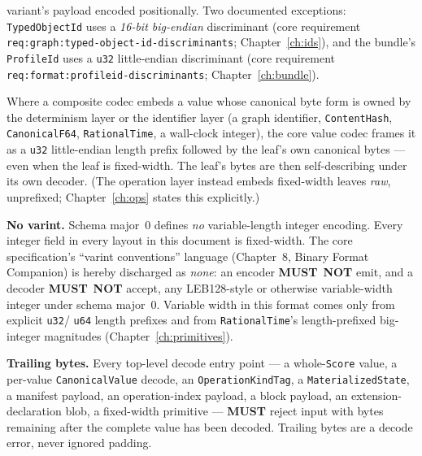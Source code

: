 \documentclass[11pt,letterpaper]{report}
\newcommand{\sectionsc}[1]{{\addfontfeatures{Letters=SmallCaps}#1}}
\newcounter{requirement}[chapter]
\newcommand{\MUST}{\textbf{MUST}}
\newcommand{\MUSTNOT}{\textbf{MUST}\nobreak\ \textbf{NOT}}
\begin{document}
\begin{description}
    variant's payload encoded positionally. Two documented exceptions:
    \texttt{TypedObjectId} uses a \emph{16-bit big-endian} discriminant
    (core requirement \texttt{req:graph:typed-object-id-discriminants};
    Chapter~\ref{ch:ids}), and the bundle's \texttt{ProfileId} uses a
    \texttt{u32} little-endian discriminant (core requirement
    \texttt{req:format:profileid-discriminants}; Chapter~\ref{ch:bundle}).
  \item[Determinism-canonical leaves.] Where a composite codec embeds a value
    whose canonical byte form is owned by the determinism layer or the
    identifier layer (a graph identifier, \texttt{ContentHash},
    \texttt{CanonicalF64}, \texttt{RationalTime}, a wall-clock integer), the
    core value codec frames it as a \texttt{u32} little-endian length prefix
    followed by the leaf's own canonical bytes --- even when the leaf is
    fixed-width. The leaf's bytes are then self-describing under its own
    decoder. (The operation layer instead embeds fixed-width leaves
    \emph{raw}, unprefixed; Chapter~\ref{ch:ops} states this explicitly.)
\end{description}

\begin{requirement}
\label{req:binfmt:no-varint}
\textbf{No varint.} Schema major~0 defines \emph{no} variable-length integer
encoding. Every integer field in every layout in this document is
fixed-width. The core specification's ``varint conventions'' language
(Chapter~8, \sectionsc{Binary Format Companion}) is hereby discharged as
\emph{none}: an encoder \MUSTNOT{} emit, and a decoder \MUSTNOT{} accept, any
LEB128-style or otherwise variable-width integer under schema major~0.
Variable width in this format comes only from explicit \texttt{u32}/%
\texttt{u64} length prefixes and from \texttt{RationalTime}'s length-prefixed
big-integer magnitudes (Chapter~\ref{ch:primitives}).
\end{requirement}

\begin{requirement}
\label{req:binfmt:trailing-bytes}
\textbf{Trailing bytes.} Every top-level decode entry point --- a
whole-\texttt{Score} value, a per-value \texttt{CanonicalValue} decode, an
\texttt{OperationKindTag}, a \texttt{MaterializedState}, a manifest payload,
an operation-index payload, a block payload, an extension-declaration blob, a
fixed-width primitive --- \MUST{} reject input with bytes remaining after the
complete value has been decoded. Trailing bytes are a decode error, never
ignored padding.
\end{requirement}
\end{document}
